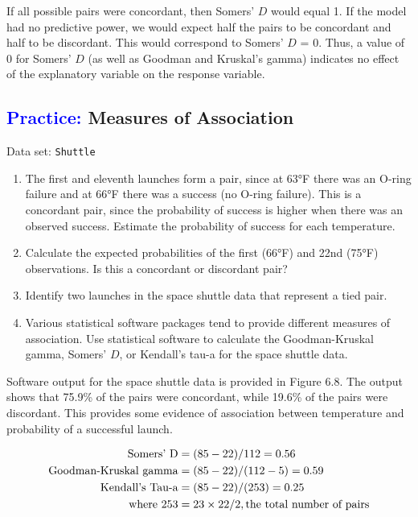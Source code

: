 \documentclass[
]{report}
\begin{document}
If all possible pairs were concordant, then Somers' \(\scriptstyle D\) would equal 1. If the model had no predictive power, we would expect half the pairs to be concordant and half to be discordant. This would correspond to Somers' \(\scriptstyle D\) = 0. Thus, a value of 0 for Somers' \(\scriptstyle D\) (as well as Goodman and Kruskal's gamma) indicates no effect of the explanatory variable on the response variable.

\hypertarget{measures-of-association}{%
\subsection*{\texorpdfstring{\textcolor{blue}{Practice:} Measures of Association}{ Measures of Association}}\label{measures-of-association}}

\vspace{-1em}

Data set: \texttt{Shuttle}

\begin{enumerate}
\def\labelenumi{\arabic{enumi}.}
\setcounter{enumi}{18}
\item
  The first and eleventh launches form a pair, since at 63°F there was an O-ring failure and at 66°F there was a success (no O-ring failure). This is a concordant pair, since the probability of success is higher when there was an observed success. Estimate the probability of success for each temperature.
\item
  Calculate the expected probabilities of the first (66°F) and 22nd (75°F) observations. Is this a concordant or discordant pair?
\item
  Identify two launches in the space shuttle data that represent a tied pair.
\item
  Various statistical software packages tend to provide different measures of association. Use statistical software to calculate the Goodman-Kruskal gamma, Somers' \(\scriptstyle D\), or Kendall's tau-a for the space shuttle data.
\end{enumerate}

Software output for the space shuttle data is provided in Figure 6.8. The output shows that 75.9\% of the pairs were concordant, while 19.6\% of the pairs were discordant. This provides some evidence of association between temperature and probability of a successful launch.

\begin{align}
\text{Somers’ D} &= (85 - 22)/112 = 0.56 \notag \\
\text{Goodman-Kruskal gamma} &= (85 - 22)/(112 - 5) = 0.59 \notag \\
\text{Kendall’s Tau-a} &= (85 - 22)/(253) = 0.25 \notag \\
\text{where } 253 &= 23 \times 22/2, \text{the total number of pairs} \notag
\end{align}
\end{document}
